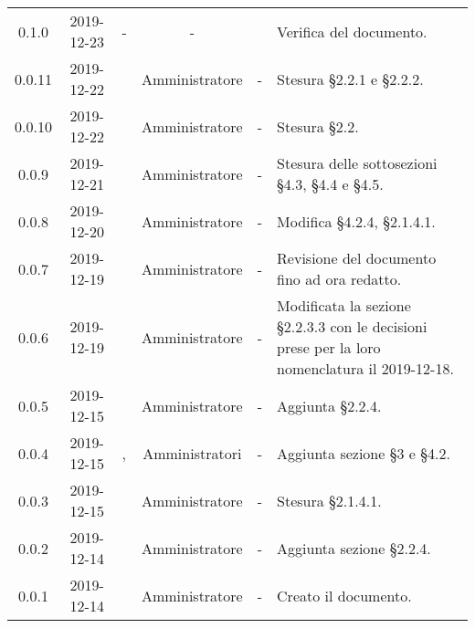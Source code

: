 {\begin{longtable}{ c c  C{2.3cm} c C{3cm} C{3.2cm}}
0.1.0 & 2019-12-23 & - & - & \CE{} & Verifica del documento. \\

0.0.11 & 2019-12-22 & \PF{} & Amministratore & - & Stesura §2.2.1 e §2.2.2. \\

0.0.10 & 2019-12-22 & \PF{} & Amministratore & - & Stesura §2.2. \\

0.0.9 & 2019-12-21 & \PF{} & Amministratore & - & Stesura delle sottosezioni §4.3, §4.4 e §4.5. \\

0.0.8 & 2019-12-20 & \MC{} & Amministratore & - & Modifica §4.2.4, §2.1.4.1. \\

0.0.7 & 2019-12-19 & \SE{} & Amministratore & - & Revisione del documento fino ad ora redatto. \\

0.0.6 & 2019-12-19 & \CE{} & Amministratore & - & Modificata la sezione §2.2.3.3 con le decisioni prese per la loro nomenclatura il 2019-12-18. \\

0.0.5 & 2019-12-15 & \SE{} & Amministratore & - & Aggiunta §2.2.4. \\

0.0.4 & 2019-12-15 & \BR{}, \PF{} & Amministratori & - & Aggiunta sezione §3 e §4.2. \\

0.0.3 & 2019-12-15 & \MC{} & Amministratore & - & Stesura §2.1.4.1. \\

0.0.2 & 2019-12-14 & \CE{} & Amministratore & - & Aggiunta sezione §2.2.4. \\

0.0.1 & 2019-12-14 & \CE{} & Amministratore & - & Creato il documento. \\
		
\end{longtable}
}